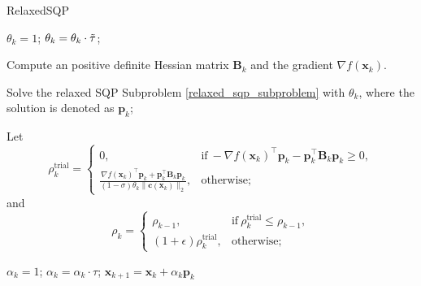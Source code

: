 \documentclass[aos]{imsart}
\numberwithin{equation}{section}
\theoremstyle{plain}
\begin{document}
\begin{algorithm}[h]
 \caption{RelaxedSQP
         }
 \label{alg_det_relaxed_sqp}
 \begin{algorithmic}[1]
 \renewcommand{\algorithmicrequire}{\textbf{Input:} $\bm{\ell} \leq \bm{x}_0 \leq \bm{u}$, $\tau, \Tilde{\tau} \in (0,1)$, $\sigma \in (0,1)$, $\rho_{-1} >0$, $\epsilon>0$, $\beta \in (0,1)$.}
 \REQUIRE 
  \STATE $\theta_k = 1$;
  \STATE $\theta_k = \theta_k \cdot \Tilde{\tau}$;

  \ENDWHILE

  \STATE Compute an positive definite Hessian matrix $\bm{B}_k$ and the gradient $\nabla f(\bm{x}_k)$.
  
  \STATE Solve the relaxed SQP Subproblem \eqref{relaxed_sqp_subproblem} with $\theta_k$, where the solution is denoted as $\bm{p}_k$;

  \STATE Let \begin{equation}
  \label{det_rho_trial}
        \rho_k^{\text{trial}} = \left \{ \begin{array}{cc}
           0,  & \text{if}~ -\nabla f(\bm{x}_k)^{\top} \bm{p}_k - \bm{p}_k^{\top} \bm{B}_k \bm{p}_k \geq 0, \\
           \frac{\nabla f(\bm{x}_k)^{\top} \bm{p}_k + \bm{p}_k^{\top} \bm{B}_k \bm{p}_k}{(1-\sigma)\theta_k \|\bm{c}(\bm{x}_k)\|_2},  &  \text{otherwise;}
        \end{array}\right.
\end{equation}
and
\begin{equation}
\label{det_rho}
    \rho_k = \left\{ \begin{array}{cc}
        \rho_{k-1}, &  \text{if}~\rho_{k}^{\text{trial}} \leq \rho_{k-1}, \\
        (1+\epsilon)\rho_{k}^{\text{trial}}, & \text{otherwise};
    \end{array} \right.
\end{equation}

  \STATE $\alpha_k = 1$;
  \STATE $\alpha_k = \alpha_k \cdot \tau$;
  \ENDWHILE
  \STATE $\bm{x}_{k+1} = \bm{x}_{k} + \alpha_k \bm{p}_{k}$
  \ENDFOR
 \end{algorithmic}
 \end{algorithm}
 
\end{document}
